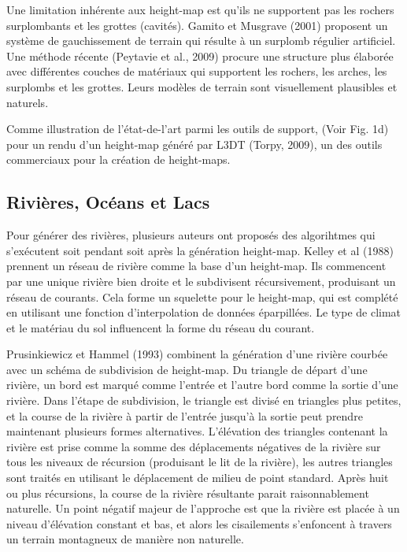 \documentclass[11pt]{article}
\begin{document}
\newline

Une limitation inhérente aux height-map est qu'ils ne supportent pas les rochers surplombants et les grottes (cavités). Gamito et Musgrave (2001) proposent un système de gauchissement de terrain qui résulte à un surplomb régulier artificiel. Une méthode récente (Peytavie et al., 2009) procure une structure plus élaborée avec différentes couches de matériaux qui supportent les rochers, les arches, les surplombs et les grottes. Leurs modèles de terrain sont visuellement plausibles et naturels.\newline

Comme illustration de l'état-de-l'art parmi les outils de support, (Voir Fig. 1d) pour un rendu d'un height-map généré par L3DT (Torpy, 2009), un des outils commerciaux pour la création de height-maps.

\subsection{Rivières, Océans et Lacs}

Pour générer des rivières, plusieurs auteurs ont proposés des algorihtmes qui s'exécutent soit pendant soit après la génération height-map. Kelley et al (1988) prennent un réseau de rivière comme la base d'un height-map. Ils commencent par une unique rivière bien droite et le subdivisent récursivement, produisant un réseau de courants. Cela forme un squelette pour le height-map, qui est complété en utilisant une fonction d'interpolation de données éparpillées. Le type de climat et le matériau du sol influencent la forme du réseau du courant. \newline

Prusinkiewicz et Hammel (1993) combinent la génération d'une rivière courbée avec un schéma de subdivision de height-map. Du triangle de départ d'une rivière, un bord est marqué comme l'entrée et l'autre bord comme la sortie d'une rivière. Dans l'étape de subdivision, le triangle est divisé en triangles plus petites, et la course de la rivière à partir de l'entrée jusqu'à la sortie peut prendre maintenant plusieurs formes alternatives. L'élévation des triangles contenant la rivière est prise comme la somme des déplacements négatives de la rivière sur tous les niveaux de récursion (produisant le lit de la rivière), les autres triangles sont traités en utilisant le déplacement de milieu de point standard. Après huit ou plus récursions, la course de la rivière résultante parait raisonnablement naturelle. Un point négatif majeur de l'approche est que la rivière est placée à un niveau d'élévation constant et bas, et alors les cisailements s'enfoncent à travers un terrain montagneux de manière non naturelle. \newline
\end{document}
